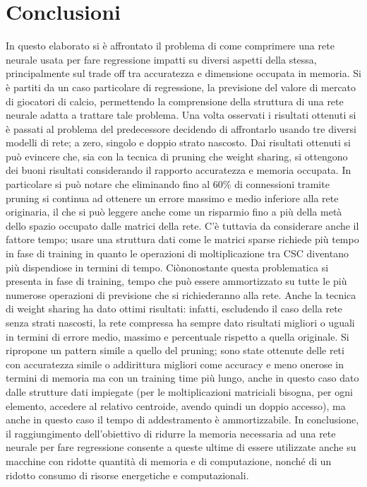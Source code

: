 \documentclass[12pt]{report}
\begin{document}
\par\null\par
\par\null\par
\par\null\par




\chapter{Conclusioni}
In questo elaborato si è affrontato il problema di come comprimere una rete neurale usata per fare regressione impatti su diversi aspetti della stessa, principalmente sul trade off tra accuratezza e dimensione occupata in memoria. Si è partiti da un caso particolare di regressione, la previsione del valore di mercato di giocatori di calcio, permettendo la comprensione della struttura di una rete neurale adatta a trattare tale problema. Una volta osservati i risultati ottenuti si è passati al problema del predecessore decidendo di affrontarlo usando tre diversi modelli di rete; a zero, singolo e doppio strato nascosto. Dai risultati ottenuti si può evincere che, sia con la tecnica di pruning che weight sharing, si ottengono dei buoni risultati considerando il rapporto accuratezza e memoria occupata. In particolare si può notare che eliminando fino al 60\% di connessioni tramite pruning si continua ad ottenere un errore massimo e medio inferiore alla rete originaria, il che si può leggere anche come un risparmio fino a più della metà dello spazio occupato dalle matrici della rete. C'è tuttavia da considerare anche il fattore tempo; usare una struttura dati come le matrici sparse richiede più tempo in fase di training in quanto le operazioni di moltiplicazione tra CSC diventano più dispendiose in termini di tempo. Ciònonostante questa problematica si presenta in fase di training, tempo che può essere ammortizzato su tutte le più numerose operazioni di previsione che si richiederanno alla rete.
Anche la tecnica di weight sharing ha dato ottimi risultati: infatti, escludendo il caso della rete senza strati nascosti, la rete compressa ha sempre dato risultati migliori o uguali in termini di errore medio, massimo e percentuale rispetto a quella originale. Si ripropone un pattern simile a quello del pruning; sono state ottenute delle reti con accuratezza simile o addirittura migliori come accuracy e meno onerose in termini di memoria ma con un training time più lungo, anche in questo caso dato dalle strutture dati impiegate (per le moltiplicazioni matriciali bisogna, per ogni elemento, accedere al relativo centroide, avendo quindi un doppio accesso), ma anche in questo caso il tempo di addestramento è ammortizzabile.
In conclusione, il raggiungimento dell'obiettivo di ridurre la memoria necessaria ad una rete neurale per fare regressione consente a queste ultime di essere utilizzate anche su macchine con ridotte quantità di memoria e di computazione, nonché di un ridotto consumo di risorse energetiche e computazionali. 

{}

\end{document}
